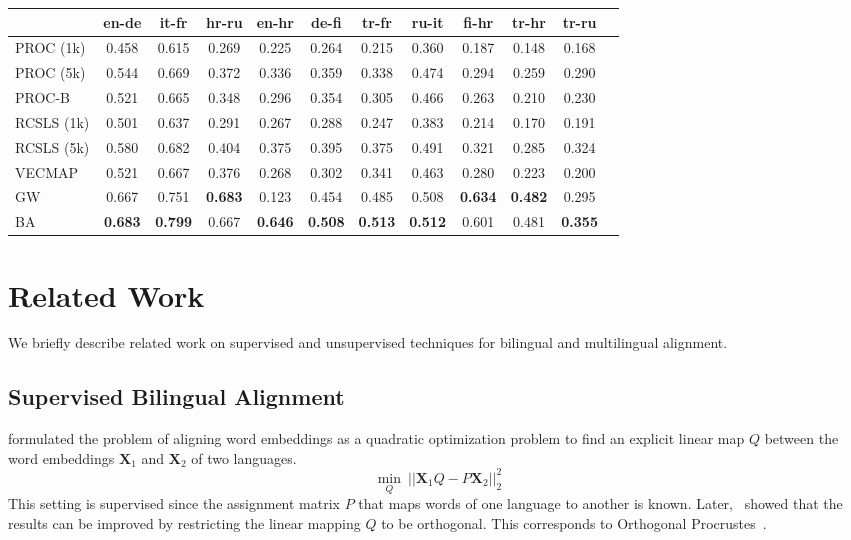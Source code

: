 \documentclass{article}
\newcommand{\Xv}{\mathbf{X}}
\begin{document}
\begin{table*}[ht!]
\centering

\begin{tabular}{@{}l@{}*{11}{c}@{}}
    \hline
    & en-de & it-fr & hr-ru & en-hr & de-fi & tr-fr & ru-it & fi-hr & tr-hr & tr-ru\\
    \hline
    PROC (1k)  & {0.458} & {0.615} & {0.269} & {0.225} & {0.264} & {0.215} & {0.360} & {0.187} & {0.148} & {0.168}\\
    PROC (5k) & {0.544} & {0.669} & {0.372} & {0.336} & {0.359} & {0.338} & {0.474} & {0.294} & {0.259} & {0.290}\\
    PROC-B & {0.521} & {0.665} & {0.348} & {0.296} & {0.354} & {0.305} & {0.466} & {0.263} & {0.210} & {0.230}\\
    RCSLS (1k) & {0.501} & {0.637} & {0.291} & {0.267} & {0.288} & {0.247} & {0.383} & {0.214} & {0.170} & {0.191}\\
    RCSLS (5k) & {0.580} & {0.682} & {0.404} & {0.375} & {0.395} & {0.375} & {0.491} & {0.321} & {0.285} & {0.324}\\
    VECMAP & {0.521} & {0.667} & {0.376} & {0.268} & {0.302} & {0.341} & {0.463} & {0.280} & {0.223} & {0.200} \\
    GW & {0.667} & {0.751} & \textbf{0.683} & {0.123} & {0.454} & {0.485} & {0.508} & \textbf{0.634} & \textbf{0.482} & {0.295} \\
    BA & \textbf{0.683} & \textbf{0.799} & {0.667} & \textbf{0.646} & \textbf{0.508} & \textbf{0.513} & \textbf{0.512} & {0.601} & {0.481} & \textbf{0.355}\\
\hline
\end{tabular}
\label{table:experiment2}
\end{table*}




 \section{Related Work}


We briefly describe related work on supervised and unsupervised techniques for bilingual and multilingual alignment.

\subsection{Supervised Bilingual Alignment}

\citet{MikolovLS13} formulated the problem of aligning word embeddings as a quadratic optimization problem to find an explicit linear map $Q$ between the word embeddings $\Xv_1$ and $\Xv_2$ of two languages. 
\begin{equation}
\min_Q ~||\Xv_1 Q - P \Xv_2||_2^2 
\end{equation}
This setting is supervised since the assignment matrix $P$ that maps words of one language to another is known. Later,~\cite{Xing2015NormalizedWE} showed that the results can be improved by restricting the linear mapping $Q$ to be orthogonal. This corresponds to Orthogonal Procrustes~\cite{Schonemann1966}.  
\end{document}
